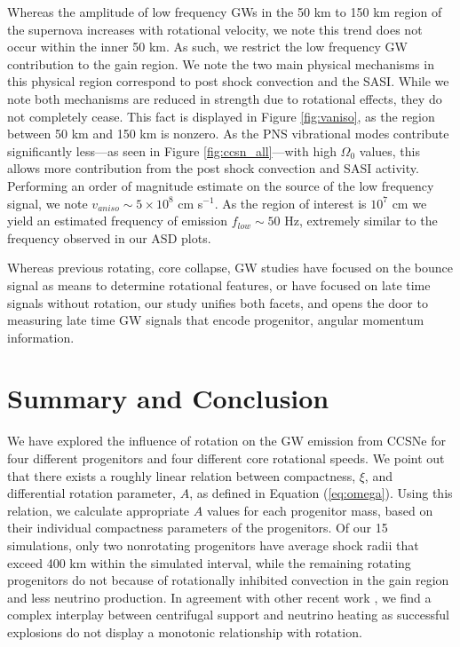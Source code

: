\documentclass[twocolumn,times]{aastex62}  %
\begin{document}
Whereas the amplitude of low frequency GWs in the 50 km to 150 km region of the supernova increases with rotational velocity, we note this trend does not occur within the inner 50 km.  As such, we restrict the low frequency GW contribution to the gain region.  We note the two main physical mechanisms in this physical region correspond to post shock convection and the SASI.  While we note both mechanisms are reduced in strength due to rotational effects, they do not completely cease.  This fact is displayed in Figure \ref{fig:vaniso}, as the region between 50 km and 150 km is nonzero.  As the PNS vibrational modes contribute significantly less---as seen in Figure \ref{fig:ccsn_all}---with high $\Omega_0$ values, this allows more contribution from the post shock convection and SASI activity.  Performing an order of magnitude estimate on the source of the low frequency signal, we note $v_{aniso} \sim 5 \times 10^8$ cm s$^{-1}$.  As the region of interest is $10^7$ cm we yield an estimated frequency of emission $f_{low} \sim 50$ Hz, extremely similar to the frequency observed in our ASD plots.

Whereas previous rotating, core collapse, GW studies have focused on the bounce signal as means to determine rotational features, or have focused on late time signals without rotation, our study unifies both facets, and opens the door to measuring late time GW signals that encode progenitor, angular momentum information. 




\section{Summary and Conclusion}
\label{sec:summary}

We have explored the influence of rotation on the GW emission from CCSNe for four different progenitors and four different core rotational speeds.  
We point out that there exists a roughly linear relation between compactness, $\xi$, and differential rotation parameter, $A$, as defined in Equation (\ref{eq:omega}). 
Using this relation, we calculate appropriate $A$ values for each progenitor mass, based on their individual compactness parameters of the \citet{Suk:2016} progenitors.  Of our 15 simulations, only two nonrotating progenitors have average shock radii that exceed 400 km within the simulated interval, while the remaining rotating progenitors do not because of rotationally inhibited convection in the gain region and less neutrino production.  In agreement with other recent work \citep[e.g.,][]{summa:2018}, we find a complex interplay between centrifugal support and neutrino heating as successful explosions do not display a monotonic relationship with rotation.
\end{document}
